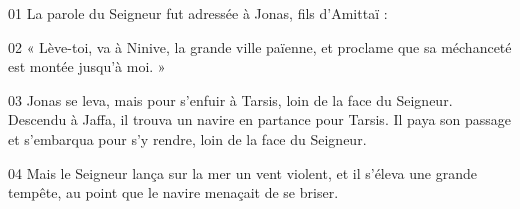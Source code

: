 01 La parole du Seigneur fut adressée à Jonas, fils d’Amittaï :

02 « Lève-toi, va à Ninive, la grande ville païenne, et proclame que sa méchanceté est montée jusqu’à moi. »

03 Jonas se leva, mais pour s’enfuir à Tarsis, loin de la face du Seigneur. Descendu à Jaffa, il trouva un navire en partance pour Tarsis. Il paya son passage et s’embarqua pour s’y rendre, loin de la face du Seigneur.

04 Mais le Seigneur lança sur la mer un vent violent, et il s’éleva une grande tempête, au point que le navire menaçait de se briser.
